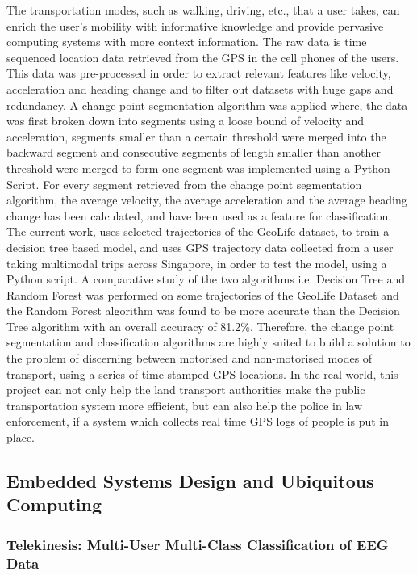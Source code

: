 \documentclass{article}
\begin{document}
The transportation modes, such as walking, driving, etc., that a user takes, can enrich the user’s mobility with informative knowledge and provide pervasive computing systems with more context information.
The raw data is time sequenced location data retrieved from the GPS in the cell phones of the users. This data was pre-processed in order to extract relevant features like velocity, acceleration and heading change and to filter out datasets with huge gaps and redundancy. A change point segmentation algorithm was applied where, the data was first broken down into segments using a loose bound of velocity and acceleration, segments smaller than a certain threshold were merged into the backward segment and consecutive segments of length smaller than another threshold were merged to form one segment was implemented using a Python Script. For every segment retrieved from the change point segmentation algorithm, the average velocity, the average acceleration and the average heading change has been calculated, and have been used as a feature for classification. The current work, uses selected trajectories of the GeoLife dataset, to train a decision tree based model, and uses GPS trajectory data collected from a user taking multimodal trips across Singapore, in order to test the model, using a Python script. A comparative study of the two algorithms i.e. Decision Tree and Random Forest was performed on some trajectories of the GeoLife Dataset and the Random Forest algorithm was found to be more accurate than the Decision Tree algorithm with an overall accuracy of 81.2\%. Therefore, the change point segmentation and classification algorithms are highly suited to build a solution to the problem of discerning between motorised and non-motorised modes of transport, using a series of time-stamped GPS locations. In the real world, this project can not only help the land transport authorities make the public transportation system more efficient, but can also help the police in law enforcement, if a system which collects real time GPS logs of people is put in place.


\subsection{Embedded Systems Design and Ubiquitous Computing}

\subsubsection{Telekinesis: Multi-User Multi-Class Classification of EEG Data}
\end{document}
